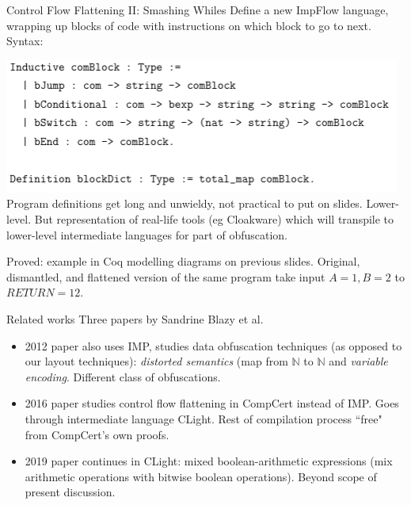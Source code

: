 \documentclass[10pt,handout]{beamer}
\theoremstyle{plain}
\theoremstyle{definition}
\newcommand\N{\mathbb{N}}
\begin{document}
\begin{frame}{Control Flow Flattening II: Smashing Whiles}
Define a new ImpFlow language, wrapping up blocks of code with instructions on which block to go to next.  Syntax:

\includegraphics[scale=0.6]{ImpFlow}
\pause
Program definitions get long and unwieldy, not practical to put on slides.  Lower-level.  But representation of real-life tools (eg Cloakware) which will transpile to lower-level intermediate languages for part of obfuscation.
\pause\par\medskip

Proved: example in Coq modelling diagrams on previous slides.  Original, dismantled, and flattened version of the same program take input $A=1, B=2$ to $RETURN=12$.


\end{frame}

\begin{frame}{Related works}
    Three papers by Sandrine Blazy et al.
    \begin{itemize}
        \item 2012 paper also uses IMP, studies data obfuscation techniques (as opposed to our layout techniques): \emph{distorted semantics} (map from $\N$ to $\N$ and \emph{variable encoding}.  Different class of obfuscations.
        \item 2016 paper studies control flow flattening in CompCert instead of IMP.  Goes through intermediate language CLight.  Rest of compilation process ``free" from CompCert's own proofs.
        \item 2019 paper continues in CLight: mixed boolean-arithmetic expressions (mix arithmetic operations with bitwise boolean operations).  Beyond scope of present discussion.
    \end{itemize}
\end{frame}
\end{document}
